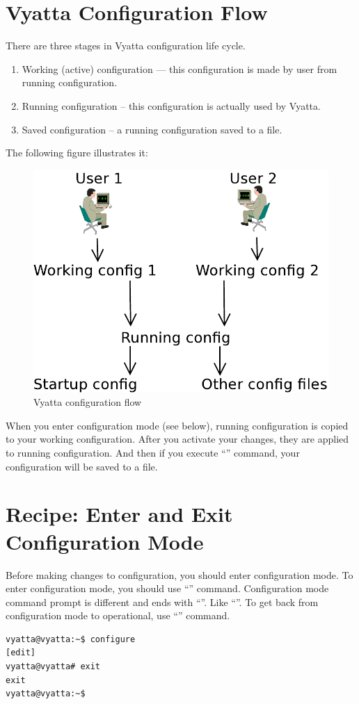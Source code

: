 \section{Vyatta Configuration Flow}
There are three stages in Vyatta configuration life cycle.
\begin{enumerate}
 \item Working (active) configuration --- this configuration is made by user from running configuration.
 \item Running configuration -- this configuration is actually used by Vyatta.
 \item Saved configuration -- a running configuration saved to a file.
\end{enumerate}
The following figure illustrates it:
\begin{figure}[hc]
 \begin{center}
   \includegraphics[width=\textwidth]{images/configuration_flow}
   \caption{Vyatta configuration flow}
  \end{center}
\end{figure}

When you enter configuration mode (see below), running configuration is copied to your working
configuration. After you activate your changes, they are applied to running configuration. And then if you
execute ``'' command, your configuration will be saved to a file.

\section{Recipe: Enter and Exit Configuration Mode}
\solution
Before making changes to configuration, you should enter configuration mode. To enter configuration mode, 
you should use ``'' command. Configuration mode command prompt is
different and ends with ``\console{\#}''. Like ``''. To get back from configuration
mode to operational, use ``'' command.
\begin{verbatim}
vyatta@vyatta:~$ configure 
[edit]
vyatta@vyatta# exit
exit
vyatta@vyatta:~$ 
\end{verbatim}

